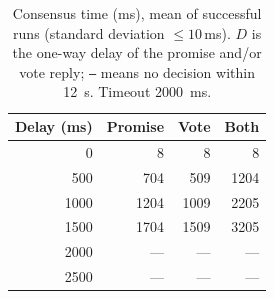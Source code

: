 \begin{table}[htbp]
\centering
\small
\begin{tabular}{r|r|r|r}
\hline
Delay (ms) & Promise & Vote & Both \\
\hline
0 & 8 & 8 & 8 \\
500 & 704 & 509 & 1204 \\
1000 & 1204 & 1009 & 2205 \\
1500 & 1704 & 1509 & 3205 \\
2000 & --- & --- & --- \\
2500 & --- & --- & --- \\
\hline
\end{tabular}
\caption{Consensus time (ms), mean of successful runs (standard deviation $\le 10$\,ms). $D$ is the one-way delay of the promise and/or vote reply; \texttt{---} means no decision within 12~s. Timeout 2000~ms.}
\label{tab:delays}
\end{table}
